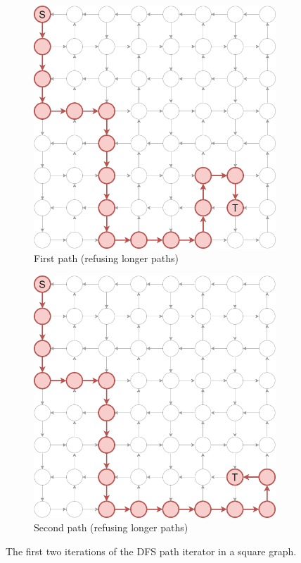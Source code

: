 \documentclass[12pt, oneside]{report}
\theoremstyle{plain}
\theoremstyle{definition}
\theoremstyle{indented}
\begin{document}
\begin{appendices}
\begin{figure}[ht]
\begin{subfigure}{.5\textwidth}
  \centering
\includegraphics[width=0.8\linewidth]{images/pathiterators/examples-DFS-1-RLP.png}
  \caption{First path (refusing longer paths)}
\end{subfigure}
\begin{subfigure}{.5\textwidth}
  \centering
\includegraphics[width=0.8\linewidth]{images/pathiterators/examples-DFS-2-RLP.png}
  \caption{Second path (refusing longer paths)}
\end{subfigure}
\caption{The first two iterations of the DFS path iterator in a square graph.}
\label{fig:pathexamples-dfs}
\end{figure}




\end{appendices}
\end{document}

